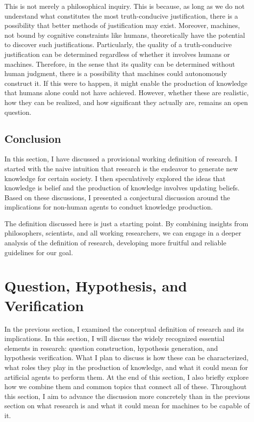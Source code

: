 

This is not merely a philosophical inquiry. This is because, as long as we do not understand what constitutes the most truth-conducive justification, there is a possibility that better methods of justification may exist. Moreover, machines, not bound by cognitive constraints like humans, theoretically have the potential to discover such justifications. Particularly, the quality of a truth-conducive justification can be determined regardless of whether it involves humans or machines. Therefore, in the sense that its quality can be determined without human judgment, there is a possibility that machines could autonomously construct it. If this were to happen, it might enable the production of knowledge that humans alone could not have achieved. However, whether these are realistic, how they can be realized, and how significant they actually are, remains an open question.

\subsection{Conclusion}
In this section, I have discussed a provisional working definition of research. I started with the naive intuition that research is the endeavor to generate new knowledge for certain society. I then speculatively explored the ideas that knowledge is belief and the production of knowledge involves updating beliefs. Based on these discussions, I presented a conjectural discussion around the implications for non-human agents to conduct knowledge production.

The definition discussed here is just a starting point. By combining insights from philosophers, scientists, and all working researchers, we can engage in a deeper analysis of the definition of research, developing more fruitful and reliable guidelines for our goal.

\section{Question, Hypothesis, and  Verification}
\label{section-question-hypothesis-verification}
In the previous section, I examined the conceptual definition of research and its implications. In this section, I will discuss the widely recognized essential elements in research: question construction, hypothesis generation, and hypothesis verification. What I plan to discuss is how these can be characterized, what roles they play in the production of knowledge, and what it could mean for artificial agents to perform them. At the end of this section, I also briefly explore how we combine them and common topics that connect all of these. Throughout this section, I aim to advance the discussion more concretely than in the previous section on what research is and what it could mean for machines to be capable of it.

